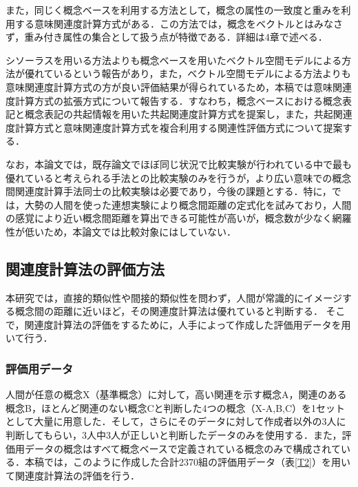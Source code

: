 また，同じく概念ベースを利用する方法として，概念の属性の一致度と重みを利用する意味関連度計算方式\cite{Izutsu,Watabe}がある．この方法では，概念をベクトルとはみなさず，重み付き属性の集合として扱う点が特徴である．詳細は4章で述べる．

シソーラスを用いる方法よりも概念ベースを用いたベクトル空間モデルによる方法が優れているという報告\cite{Kawashima}があり，また，ベクトル空間モデルによる方法よりも意味関連度計算方式の方が良い評価結果が得られている\cite{Watabe}ため，本稿では意味関連度計算方式の拡張方式について報告する．すなわち，概念ベースにおける概念表記と概念表記の共起情報を用いた共起関連度計算方式を提案し，また，共起関連度計算方式と意味関連度計算方式を複合利用する関連性評価方式について提案する．

なお，本論文では，既存論文でほぼ同じ状況で比較実験が行われている中で最も優れていると考えられる手法との比較実験のみを行うが，より広い意味での概念間関連度計算手法同士の比較実験は必要であり，今後の課題とする．特に，\cite{Okamoto}では，大勢の人間を使った連想実験により概念間距離の定式化を試みており，人間の感覚により近い概念間距離を算出できる可能性が高いが，概念数が少なく網羅性が低いため，本論文では比較対象にはしていない．


\subsection{関連度計算法の評価方法}

本研究では，直接的類似性や間接的類似性を問わず，人間が常識的にイメージする概念間の距離に近いほど，その関連度計算法は優れていると判断する．
そこで，関連度計算法の評価をするために，人手によって作成した評価用データを用いて行う．

\subsubsection{評価用データ}

人間が任意の概念X（基準概念）に対して，高い関連を示す概念A，関連のある概念B，ほとんど関連のない概念Cと判断した4つの概念（X-A,B,C）を1セットとして大量に用意した．そして，さらにそのデータに対して作成者以外の3人に判断してもらい，3人中3人が正しいと判断したデータのみを使用する．また，評価用データの概念はすべて概念ベースで定義されている概念のみで構成されている．本稿では，このように作成した合計2370組の評価用データ（表\ref{T2}）を用いて関連度計算法の評価を行う．

